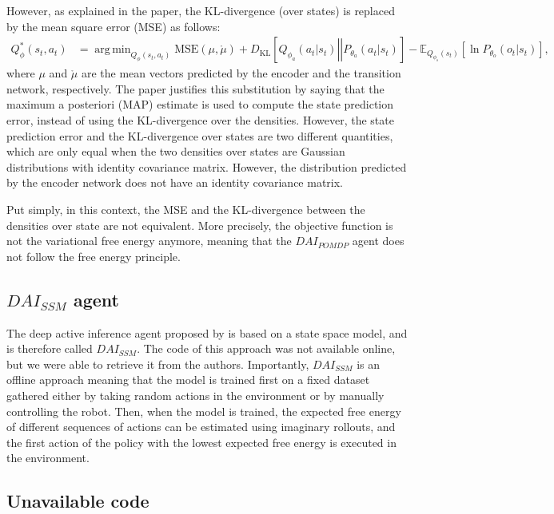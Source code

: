 \documentclass[twoside,11pt]{article}
\newcommand{\kl}[2]{D_{\mathrm{KL}} \left[ \left. \left. #1 \right|\right| #2 \right] }
\DeclareMathOperator*{\argmin}{arg\,min}
\begin{document}
However, as explained in the paper, the KL-divergence (over states) is replaced by the mean square error (MSE) as follows:
\begin{align*}
Q^*_{\phi}(s_t, a_t) &= \argmin_{Q_{\phi}(s_t, a_t)} \text{MSE}(\mu, \mathring{\mu}) + \kl{Q_{\phi_a}(a_t|s_t)}{P_{\theta_a}(a_t|s_t)} - \mathbb{E}_{Q_{\phi_s}(s_t)}[\ln P_{\theta_o}(o_t|s_t)],
\end{align*}
where $\mu$ and $\mathring{\mu}$ are the mean vectors predicted by the encoder and the transition network, respectively. The paper justifies this substitution by saying that the maximum a posteriori (MAP) estimate is used to compute the state prediction error, instead of using the KL-divergence over the densities. However, the state prediction error and the KL-divergence over states are two different quantities, which are only equal when the two densities over states are Gaussian distributions with identity covariance matrix. However, the distribution predicted by the encoder network does not have an identity covariance matrix.

Put simply, in this context, the MSE and the KL-divergence between the densities over state are not equivalent. More precisely, the objective function is not the variational free energy anymore, meaning that the $DAI_{POMDP}$ agent does not follow the free energy principle.

\subsection{$DAI_{SSM}$ agent \citep{DAI_POMDP}}

The deep active inference agent proposed by \citep{ccatal2020learning} is based on a state space model, and is therefore called $DAI_{SSM}$. The code of this approach was not available online, but we were able to retrieve it from the authors. Importantly, $DAI_{SSM}$ is an offline approach meaning that the model is trained first on a fixed dataset gathered either by taking random actions in the environment or by manually controlling the robot. Then, when the model is trained, the expected free energy of different sequences of actions can be estimated using imaginary rollouts, and the first action of the policy with the lowest expected free energy is executed in the environment.

\subsection{Unavailable code}
\end{document}
